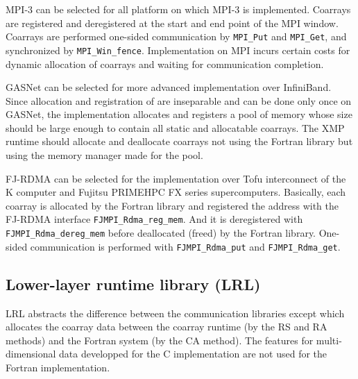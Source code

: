MPI-3 can be selected for all platform on which MPI-3 is implemented. Coarrays are 
registered and deregistered at the start and end point of the MPI window. 
Coarrays are performed one-sided communication by {\tt MPI\_Put} and {\tt MPI\_Get},
and synchronized by {\tt MPI\_Win\_fence}. 
Implementation on MPI incurs certain costs for dynamic allocation of coarrays and 
waiting for communication completion.

GASNet can be selected for more advanced implementation over InfiniBand. 
Since allocation and registration of are inseparable and can be done only once 
on GASNet, the implementation allocates and registers a pool of memory
whose size should be large enough to contain all static and allocatable coarrays.
The XMP runtime should allocate and deallocate coarrays not using the Fortran 
library but using the memory manager made for the pool.

FJ-RDMA can be selected for the implementation over Tofu interconnect of 
the K computer and Fujitsu PRIMEHPC FX series supercomputers. 
Basically, each coarray is allocated by the Fortran library and registered 
the address with the FJ-RDMA interface {\tt FJMPI\_Rdma\_reg\_mem}. 
And it is deregistered with {\tt FJMPI\_Rdma\_dereg\_mem} before deallocated 
(freed) by the Fortran library. 
One-sided communication is performed with {\tt FJMPI\_Rdma\_put} and 
{\tt FJMPI\_Rdma\_get}.


\subsection{Lower-layer runtime library (LRL)}

LRL abstracts the difference between the communication libraries except 
which allocates the coarray data between the coarray runtime 
(by the RS and RA methods) and the Fortran system (by the CA method).
The features for multi-dimensional data developped for the C implementation
are not used for the Fortran implementation.

